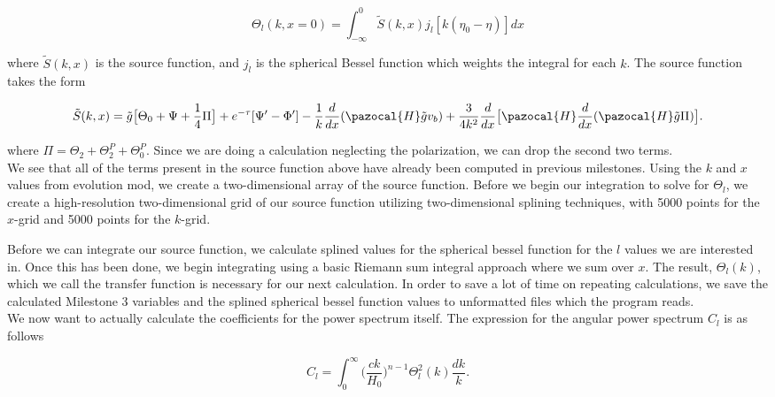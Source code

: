 \documentclass[a4paper]{article}
\begin{document}
\begin{equation}\label{eq:transf}
\Theta_l(k,x=0) = \int_{-\infty}^0 \tilde{S}(k,x)j_l[k(\eta_0 - \eta)]dx
\end{equation}

where $\tilde{S}(k,x)$ is the source function, and $j_l$ is the spherical Bessel function which weights the integral for each $k$. The source function takes the form

\begin{equation}\label{eq:source}
\tilde{S}(k,x) = \tilde{g} \big[\Theta_0 + \Psi + \dfrac{1}{4}\Pi \big] + e^{-\tau}[\Psi' - \Phi'] - \dfrac{1}{k}\dfrac{d}{dx}(\pazocal{H}\tilde{g}v_b) + \dfrac{3}{4k^2}\dfrac{d}{dx} \big[\pazocal{H}\dfrac{d}{dx}(\pazocal{H}\tilde{g}\Pi) \big].
\end{equation}

where $\Pi = \Theta_2 + \Theta_2^P + \Theta_0^P$. Since we are doing a calculation neglecting the polarization, we can drop the second two terms.\\

We see that all of the terms present in the source function above have already been computed in previous milestones. Using the $k$ and $x$ values from evolution mod, we create a two-dimensional array of the source function. Before we begin our integration to solve for $\Theta_l$, we create a high-resolution two-dimensional grid of our source function utilizing two-dimensional splining techniques, with 5000 points for the $x$-grid and 5000 points for the $k$-grid.\\

\clearpage

Before we can integrate our source function, we calculate splined values for the spherical bessel function for the $l$ values we are interested in. Once this has been done, we begin integrating using a basic Riemann sum integral approach where we sum over $x$. The result, $\Theta_l(k)$, which we call the transfer function is necessary for our next calculation. In order to save a lot of time on repeating calculations, we save the calculated Milestone 3 variables and the splined spherical bessel function values to unformatted files which the program reads.\\

We now want to actually calculate the coefficients for the power spectrum itself. The expression for the angular power spectrum $C_l$ is as follows

\begin{equation}\label{eq:power}
C_l = \int_0^{\infty} \Big(\dfrac{ck}{H_0}\Big)^{n-1} \Theta_l^2(k) \dfrac{dk}{k}.
\end{equation} 
\end{document}
